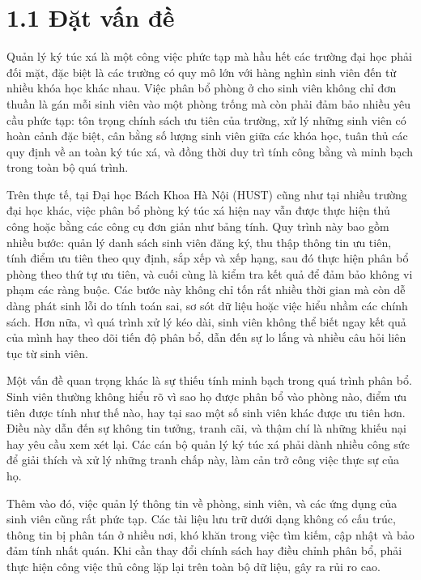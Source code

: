 \documentclass[a4paper,12pt]{report}
\begin{document}
\section*{1.1 Đặt vấn đề}

Quản lý ký túc xá là một công việc phức tạp mà hầu hết các trường đại học phải đối mặt, đặc biệt là các trường có quy mô lớn với hàng nghìn sinh viên đến từ nhiều khóa học khác nhau. Việc phân bổ phòng ở cho sinh viên không chỉ đơn thuần là gán mỗi sinh viên vào một phòng trống mà còn phải đảm bảo nhiều yêu cầu phức tạp: tôn trọng chính sách ưu tiên của trường, xử lý những sinh viên có hoàn cảnh đặc biệt, cân bằng số lượng sinh viên giữa các khóa học, tuân thủ các quy định về an toàn ký túc xá, và đồng thời duy trì tính công bằng và minh bạch trong toàn bộ quá trình.

Trên thực tế, tại Đại học Bách Khoa Hà Nội (HUST) cũng như tại nhiều trường đại học khác, việc phân bổ phòng ký túc xá hiện nay vẫn được thực hiện thủ công hoặc bằng các công cụ đơn giản như bảng tính. Quy trình này bao gồm nhiều bước: quản lý danh sách sinh viên đăng ký, thu thập thông tin ưu tiên, tính điểm ưu tiên theo quy định, sắp xếp và xếp hạng, sau đó thực hiện phân bổ phòng theo thứ tự ưu tiên, và cuối cùng là kiểm tra kết quả để đảm bảo không vi phạm các ràng buộc. Các bước này không chỉ tốn rất nhiều thời gian mà còn dễ dàng phát sinh lỗi do tính toán sai, sơ sót dữ liệu hoặc việc hiểu nhầm các chính sách. Hơn nữa, vì quá trình xử lý kéo dài, sinh viên không thể biết ngay kết quả của mình hay theo dõi tiến độ phân bổ, dẫn đến sự lo lắng và nhiều câu hỏi liên tục từ sinh viên.

Một vấn đề quan trọng khác là sự thiếu tính minh bạch trong quá trình phân bổ. Sinh viên thường không hiểu rõ vì sao họ được phân bổ vào phòng nào, điểm ưu tiên được tính như thế nào, hay tại sao một số sinh viên khác được ưu tiên hơn. Điều này dẫn đến sự không tin tưởng, tranh cãi, và thậm chí là những khiếu nại hay yêu cầu xem xét lại. Các cán bộ quản lý ký túc xá phải dành nhiều công sức để giải thích và xử lý những tranh chấp này, làm cản trở công việc thực sự của họ.

Thêm vào đó, việc quản lý thông tin về phòng, sinh viên, và các ứng dụng của sinh viên cũng rất phức tạp. Các tài liệu lưu trữ dưới dạng không có cấu trúc, thông tin bị phân tán ở nhiều nơi, khó khăn trong việc tìm kiếm, cập nhật và bảo đảm tính nhất quán. Khi cần thay đổi chính sách hay điều chỉnh phân bổ, phải thực hiện công việc thủ công lặp lại trên toàn bộ dữ liệu, gây ra rủi ro cao.
\end{document}
